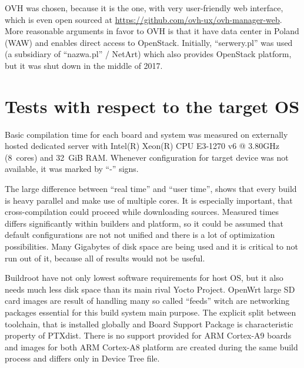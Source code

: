 \documentclass[printmode]{mgr}
\begin{document}
OVH was chosen, because it is the one, with very user-friendly web interface, which is even open sourced at \url{https://github.com/ovh-ux/ovh-manager-web}.
More reasonable arguments in favor to OVH is that it have data center in Poland (WAW) and enables direct access to OpenStack.
Initially, ``serwery.pl'' was used (a subsidiary of ``nazwa.pl'' / NetArt) which also provides OpenStack platform, but it was shut down in the middle of 2017.











\section{Tests with respect to the target OS}


Basic compilation time for each board and system was measured on externally hosted dedicated server with Intel(R) Xeon(R) CPU E3-1270 v6 @ 3.80GHz (8~cores) and 32~GiB RAM.
Whenever configuration for target device was not available, it was marked by ``-'' signs.

The large difference between ``real time'' and ``user time'', shows that every build is heavy parallel and make use of multiple cores.
It is especially important, that cross-compilation could proceed while downloading sources.
Measured times differs significantly within builders and platform, so it could be assumed that default configurations are not not unified and there is a lot of optimization possibilities.
Many Gigabytes of disk space are being used and it is critical to not run out of it, because all of results would not be useful.

Buildroot have not only lowest software requirements for host OS, but it also needs much less disk space than its main rival Yocto Project. OpenWrt large SD card images are result of handling many so called ``feeds'' witch are networking packages essential for this build system main purpose. The explicit split between toolchain, that is installed globally and Board Support Package is characteristic property of PTXdist. There is no support provided for ARM Cortex-A9 boards and images for both ARM Cortex-A8 platform are created during the same build process and differs only in Device Tree file.
\end{document}
